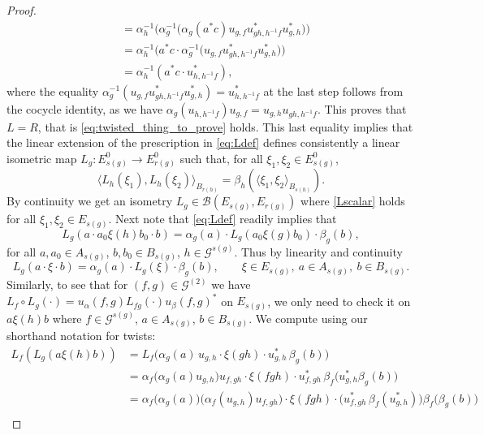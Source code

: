 \documentclass[10pt,a4paper]{amsart}
\newcommand{\B}{\mathcal B}
\newcommand{\G}{\mathcal G} %
\begin{document}
\begin{proof}
\[\begin{split}
        &= \alpha_{h}^{-1} \Big( \alpha_{g}^{-1} \big(  \alpha_g(a^* c)u_{g,f} u^{*}_{gh,h^{-1}f} u^{*}_{g,h} \big) \big) \\
        &= \alpha_{h}^{-1} \Big( a^* c\cdot \alpha_{g}^{-1} \big( u_{g,f} u^{*}_{gh,h^{-1}f} u^{*}_{g,h} \big) \Big) \\
        &= \alpha_{h}^{-1}( a^* c\cdot  u^{*}_{h,h^{-1}f} ) , 
\end{split}
\]
where the equality $\alpha_{g}^{-1}(u_{g,f} u^{*}_{gh,h^{-1}f} u^{*}_{g,h}) = u^{*}_{h,h^{-1}f}$ at the last step follows from the cocycle identity, as we have $ \alpha_g (u_{h,h^{-1}f})u_{g,f} = u_{g,h}u_{gh,h^{-1}f}$. 
This proves that $L=R$, that is \eqref{eq:twisted_thing_to_prove} holds.
This last equality implies that the linear extension of the prescription in \eqref{eq:Ldef} defines consistently a linear isometric map $L_g: E_{s(g)}^0 \to E_{r(g)}^0$ such that, for all $\xi_1, \xi_2 \in E_{s(g)}^0$, 
\begin{equation}\label{Lscalar}
    \langle L_h(\xi_1), L_h(\xi_2) \rangle_{B_{r(h)}} = \beta_h( \langle \xi_1, \xi_2 \rangle_{B_{s(h)}}) . 
\end{equation}
By continuity we get an isometry $L_g \in \B(E_{s(g)}, E_{r(g)})$ where \eqref{Lscalar} holds for all $\xi_1, \xi_2 \in E_{s(g)}$. 
Next note that \eqref{eq:Ldef} readily implies that 
\[ 
    L_g (a \cdot a_0 \xi(h)b_0\cdot b) = \alpha_g(a)\cdot  L_g(a_0 \xi(g)b_0) \cdot \beta_g(b), 
\]
for all $a,a_0 \in A_{s(g)}$, $b,b_0 \in B_{s(g)}$, $h\in \G^{s(g)}$. 
Thus by linearity and continuity 
\[ 
    L_g (a\cdot \xi \cdot b) = \alpha_g(a)\cdot L_g(\xi) \cdot \beta_g(b), \qquad  \xi \in E_{s(g)} ,\ a \in A_{s(g)} ,\ b \in  B_{s(g)}. 
\]
Similarly, to see that for $(f,g)\in \G^{(2)}$ we have $L_{f}\circ L_{g}(\cdot) = u_{\alpha}(f,g)L_{fg}(\cdot)u_{\beta}(f,g)^*$ on $E_{s(g)}$, we only need to check it on $a\xi(h)b$ where $f\in \G^{s(g)}$, $a \in A_{s(g)}$, $b \in B_{s(g)}$. 
We compute using our shorthand notation for twists: 
\[
\begin{split} 
    L_{f}( L_{g}(a\xi(h)b)) &= L_f\Big(\alpha_g(a)\,u_{g,h} \cdot\xi(gh)\cdot u_{g,h}^*\,\beta_g(b)\Big) \\
        &= \alpha_f\big(\alpha_g(a) u_{g,h}\big) u_{f,gh}\cdot \xi(fgh) \cdot u_{f,gh}^* \,\beta_f\big(u_{g,h}^* \beta_g(b)\big) \\
        &= \alpha_f\big(\alpha_g(a)\big) \big( \alpha_f (u_{g,h}) u_{f,gh}\big) \cdot \xi(fgh) \cdot \big( u_{f,gh}^* \,\beta_f(u_{g,h}^*)\big) \beta_f\big(\beta_g(b)\big) \\

\end{split}\]
\end{proof}
\end{document}
